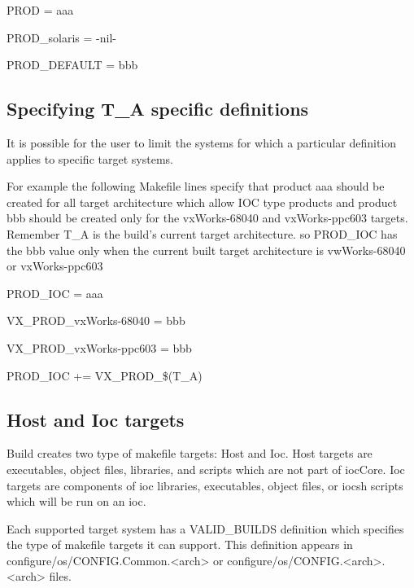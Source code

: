 \begin{description}\item PROD = aaa

\item PROD\_solaris = -nil-

\item PROD\_DEFAULT = bbb

\end{description}\subsection{Specifying T\_A specific definitions}

It is possible for the user to limit the systems for which a particular definition applies to specific target systems. 

For example the following Makefile lines specify that product aaa should be created for all target architecture which allow 
IOC type products and product bbb should be created only for the vxWorks-68040 and vxWorks-ppc603 targets. 
Remember T\_A is the build's current target architecture. so PROD\_IOC has the bbb value only when the current built 
target architecture is vwWorks-68040 or vxWorks-ppc603

\begin{description}\item PROD\_IOC = aaa

\item VX\_PROD\_vxWorks-68040 = bbb

\item VX\_PROD\_vxWorks-ppc603 = bbb

\item PROD\_IOC += VX\_PROD\_\$(T\_A)

\end{description}\subsection{Host and Ioc targets}

Build creates two type of makefile targets: Host and Ioc. Host targets are executables, object files, libraries, and scripts 
which are not part of iocCore. Ioc targets are components of ioc libraries, executables, object files, or iocsh scripts which 
will be run on an ioc.

Each supported target system has a VALID\_BUILDS definition which specifies the type of makefile targets it can 
support. This definition appears in configure/os/CONFIG.Common.\textless{}arch\textgreater{} or configure/os/CONFIG.\textless{}arch\textgreater{}.\textless{}arch\textgreater{} files.

